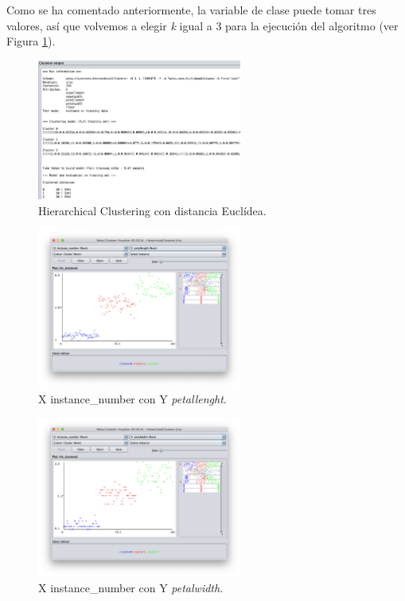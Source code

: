 \documentclass[11pt]{exam}
\begin{document}
\begin{questions}
Como se ha comentado anteriormente, la variable de clase puede tomar tres valores, así que volvemos a elegir \textit{k} igual a 3 para la ejecución del algoritmo (ver Figura \ref{Captura_6}).

\begin{figure}[h]
	\centering
	\includegraphics[width=0.6\textwidth]{hc_euclidea.png}
	\caption{Hierarchical Clustering con distancia Euclídea.}
	\label{Captura_6}
\end{figure}

\begin{figure}[h]
	\centering
	\includegraphics[width=0.6\textwidth]{hc_petallenght.png}
	\caption{X instance\_number con Y \textit{petallenght}.}
	\label{Captura_7}
\end{figure}

\begin{figure}[h]
	\centering
	\includegraphics[width=0.6\textwidth]{hc_petalwidth.png}
	\caption{X instance\_number con Y \textit{petalwidth}.}
	\label{Captura_8}
\end{figure}


\end{questions}
\end{document}
